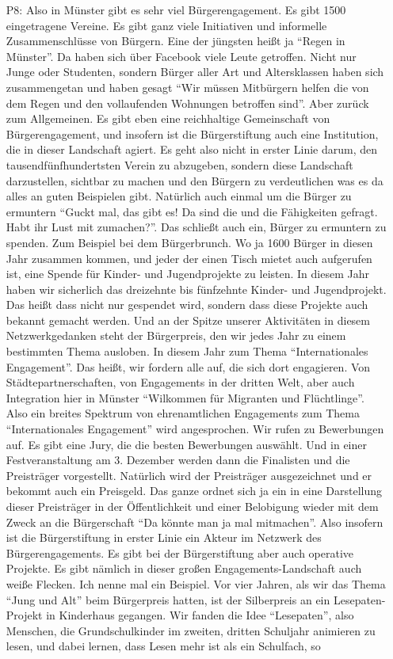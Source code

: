 \begin{itemize}
    \item[P8:] Also in M{\"u}nster gibt es sehr viel B{\"u}rgerengagement. Es gibt 1500 eingetragene Vereine. Es gibt ganz viele Initiativen und informelle Zusammenschl{\"u}sse von B{\"u}rgern. Eine der j{\"u}ngsten hei{\ss}t ja "`Regen in M{\"u}nster"'. Da haben sich {\"u}ber Facebook viele Leute getroffen. Nicht nur Junge oder Studenten, sondern B{\"u}rger aller Art und Altersklassen haben sich zusammengetan und haben gesagt "`Wir m{\"u}ssen Mitb{\"u}rgern helfen die von dem Regen und den vollaufenden Wohnungen betroffen sind"'. Aber zur{\"u}ck zum Allgemeinen. Es gibt eben eine reichhaltige Gemeinschaft von B{\"u}rgerengagement, und insofern ist die B{\"u}rgerstiftung auch eine Institution, die in dieser Landschaft agiert. Es geht also nicht in erster Linie darum, den tausendf{\"u}nfhundertsten Verein zu abzugeben, sondern diese Landschaft darzustellen, sichtbar zu machen und den B{\"u}rgern zu verdeutlichen was es da alles an guten Beispielen gibt. Nat{\"u}rlich auch einmal um die B{\"u}rger zu ermuntern "`Guckt mal, das gibt es! Da sind die und die F{\"a}higkeiten gefragt. Habt ihr Lust mit zumachen?"'. Das schlie{\ss}t auch ein, B{\"u}rger zu ermuntern zu spenden. Zum Beispiel bei dem B{\"u}rgerbrunch. Wo ja 1600 B{\"u}rger in diesen Jahr zusammen kommen, und jeder der einen Tisch mietet auch aufgerufen ist, eine Spende f{\"u}r Kinder- und Jugendprojekte zu leisten. In diesem Jahr haben wir sicherlich das dreizehnte bis f{\"u}nfzehnte Kinder- und Jugendprojekt. Das hei{\ss}t dass nicht nur gespendet wird, sondern dass diese Projekte auch bekannt gemacht werden. Und an der Spitze unserer Aktivit{\"a}ten in diesem Netzwerkgedanken steht der B{\"u}rgerpreis, den wir jedes Jahr zu einem bestimmten Thema ausloben. In diesem Jahr zum Thema "`Internationales Engagement"'. Das hei{\ss}t, wir fordern alle auf, die sich dort engagieren. Von St{\"a}dtepartnerschaften, von Engagements in der dritten Welt, aber auch Integration hier in M{\"u}nster "`Wilkommen f{\"u}r Migranten und Fl{\"u}chtlinge"'. Also ein breites Spektrum von ehrenamtlichen Engagements zum Thema "`Internationales Engagement"' wird angesprochen. Wir rufen zu Bewerbungen auf. Es gibt eine Jury, die die besten Bewerbungen ausw{\"a}hlt. Und in einer Festveranstaltung am 3. Dezember werden dann die Finalisten und die Preistr{\"a}ger vorgestellt. Nat{\"u}rlich wird der Preistr{\"a}ger ausgezeichnet und er bekommt auch ein Preisgeld. Das ganze ordnet sich ja ein in eine Darstellung dieser Preistr{\"a}ger in der {\"O}ffentlichkeit und einer Belobigung wieder mit dem Zweck an die B{\"u}rgerschaft "`Da k{\"o}nnte man ja mal mitmachen"'. Also insofern ist die B{\"u}rgerstiftung in erster Linie ein Akteur im Netzwerk des B{\"u}rgerengagements. Es gibt bei der B{\"u}rgerstiftung aber auch operative Projekte. Es gibt n{\"a}mlich in dieser gro{\ss}en Engagements-Landschaft auch wei{\ss}e Flecken. Ich nenne mal ein Beispiel. Vor vier Jahren, als wir das Thema "`Jung und Alt"' beim B{\"u}rgerpreis hatten, ist der Silberpreis an ein Lesepaten-Projekt in Kinderhaus gegangen. Wir fanden die Idee "`Lesepaten"', also Menschen, die Grundschulkinder im zweiten, dritten Schuljahr animieren zu lesen, und dabei lernen, dass Lesen mehr ist als ein Schulfach, so 
\end{itemize}
